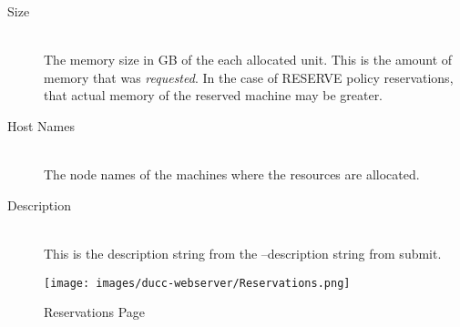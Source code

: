 \begin{description}
\item[Size] \hfill \\
  The memory size in GB of the each allocated unit.  This is the amount of memory that
  was {\em requested}.  In the case of RESERVE policy reservations, that actual memory
  of the reserved machine may be greater.
  
\item[Host Names] \hfill \\
  The node names of the machines where the resources are allocated.
  
\item[Description] \hfill \\
  This is the description string from the --description string from submit.
\end{description}

    \begin{figure}[ht!]
    \centering
    \texttt{[image: images/ducc-webserver/Reservations.png]}
    \caption{Reservations Page}
    \end{figure}
